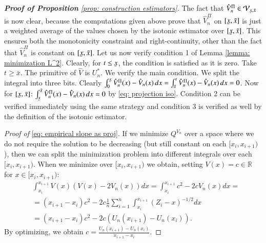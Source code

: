 \begin{proof}[\hypertarget{proof of prop constructions}{\textbf{Proof of Proposition}} \ref{prop: construction estimators}]
    The fact that $\hat{V}^{\Pi}_n \in \mathcal{V}_{\scriptstyle{\ubar{x},\bar{x}}}$ is now clear, because the computations given above prove that $\hat{V}^{\Pi}_n$ on $[\ubar{x},\bar{x}]$ is just a weighted average of the values chosen by the isotonic estimator over $[\ubar{x},\bar{x}]$. This ensures both the monotonicity constraint and right-continuity, other than the fact that $\hat{V}^{\Pi}_n$ is constant on $[\ubar{x},\bar{x}]$. Let us now verify condition 1 of Lemma \ref{lemma: minimization L^2}. Clearly, for $t \leq \ubar{x}$, the condition is satisfied as it is zero. Take $t \geq \bar{x}$. The primitive of $\hat{V}$ is $U^*_n$. We verify the main condition. We split the integral into three bits. Clearly $\int_{0}^{\ubar{x}} \hat{V}^{\Pi}_n(x) - \hat{V}_n(x) \, dx = \int_{\bar{x}}^{t} \hat{V}^{\Pi}_n(x) - \hat{V}_n(x) \, dx = 0 $. Now for $[\ubar{x},\bar{x}]$: $\int_{\ubar{x}}^{\bar{x}} \hat{V}^{\Pi}_n(x) - \hat{V}_n(x) \, dx = 0$ by \eqref{eq: projection iso}. Condition 2 can be verified immediately using the same strategy and condition 3 is verified as well by the definition of the isotonic estimator.


    \vskip 0.1cm

\textit{Proof of} \eqref{eq: empirical slope as proj}. If we minimize $Q^{V_n}$ over a space where we do not require the solution to be decreasing (but still constant on each $[x_i,x_{i+1})$), then we can split the minimization problem into different integrals over each $[x_i,x_{i+1})$. When we minimize over $[x_i,x_{i+1})$ we obtain, setting $V(x)=c \in \mathbb{R}$ for $x \in [x_i,x_{i+1})$:
$$
\begin{aligned}
& \int_{x_i}^{x_{i+1}} V(x)\left(V(x)-2 V_n(x)\right) d x=\int_{x_i}^{x_{i+1}} c^2-2 c V_n(x) d x= \\
& =(x_{i+1}-x_i) c^2-2 c \frac{1}{n} \sum_{i=1}^n \int_{x_i}^{x_{i+1}} \left(Z_i-x\right)^{-1 / 2} d x \\
&=(x_{i+1}-x_i) c^2-2 c\left(U_n(x_{i+1})-U_n(x_i)\right).
\end{aligned}
$$
By optimizing, we obtain $c=\frac{U_n(x_{i+1})-U_n(x_i)}{x_{i+1}-x_i}$.
\vskip 0.1cm
    


\end{proof}
